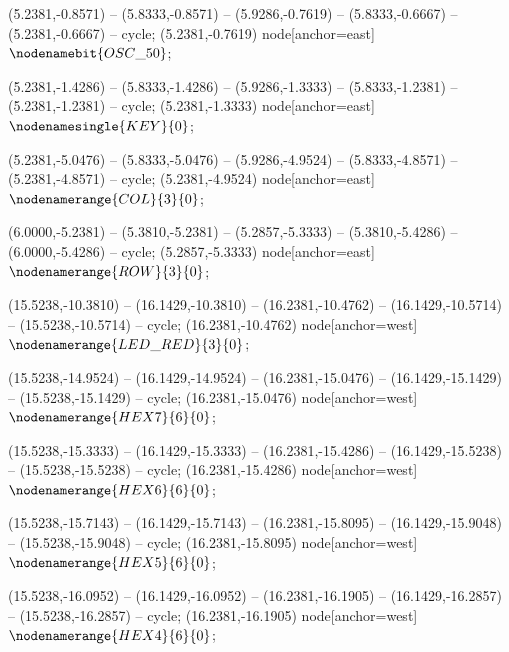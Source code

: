    (5.2381,-0.8571) -- (5.8333,-0.8571) -- (5.9286,-0.7619) -- (5.8333,-0.6667) -- (5.2381,-0.6667) -- cycle;
   (5.2381,-0.7619) node[anchor=east] {$\nodenamebit{OSC\_50}$};

   (5.2381,-1.4286) -- (5.8333,-1.4286) -- (5.9286,-1.3333) -- (5.8333,-1.2381) -- (5.2381,-1.2381) -- cycle;
   (5.2381,-1.3333) node[anchor=east] {$\nodenamesingle{KEY}{0}$};

   (5.2381,-5.0476) -- (5.8333,-5.0476) -- (5.9286,-4.9524) -- (5.8333,-4.8571) -- (5.2381,-4.8571) -- cycle;
   (5.2381,-4.9524) node[anchor=east] {$\nodenamerange{COL}{3}{0}$};

   (6.0000,-5.2381) -- (5.3810,-5.2381) -- (5.2857,-5.3333) -- (5.3810,-5.4286) -- (6.0000,-5.4286) -- cycle;
   (5.2857,-5.3333) node[anchor=east] {$\nodenamerange{ROW}{3}{0}$};

   (15.5238,-10.3810) -- (16.1429,-10.3810) -- (16.2381,-10.4762) -- (16.1429,-10.5714) -- (15.5238,-10.5714) -- cycle;
   (16.2381,-10.4762) node[anchor=west] {$\nodenamerange{LED\_RED}{3}{0}$};

   (15.5238,-14.9524) -- (16.1429,-14.9524) -- (16.2381,-15.0476) -- (16.1429,-15.1429) -- (15.5238,-15.1429) -- cycle;
   (16.2381,-15.0476) node[anchor=west] {$\nodenamerange{HEX7}{6}{0}$};

   (15.5238,-15.3333) -- (16.1429,-15.3333) -- (16.2381,-15.4286) -- (16.1429,-15.5238) -- (15.5238,-15.5238) -- cycle;
   (16.2381,-15.4286) node[anchor=west] {$\nodenamerange{HEX6}{6}{0}$};

   (15.5238,-15.7143) -- (16.1429,-15.7143) -- (16.2381,-15.8095) -- (16.1429,-15.9048) -- (15.5238,-15.9048) -- cycle;
   (16.2381,-15.8095) node[anchor=west] {$\nodenamerange{HEX5}{6}{0}$};

   (15.5238,-16.0952) -- (16.1429,-16.0952) -- (16.2381,-16.1905) -- (16.1429,-16.2857) -- (15.5238,-16.2857) -- cycle;
   (16.2381,-16.1905) node[anchor=west] {$\nodenamerange{HEX4}{6}{0}$};

